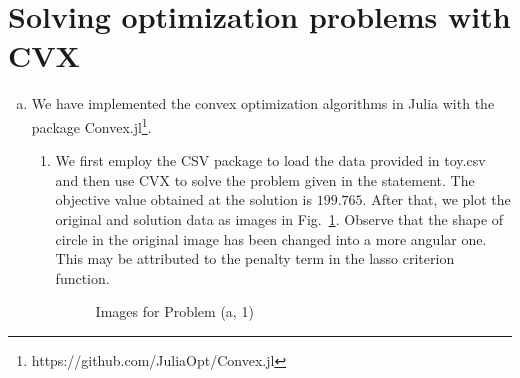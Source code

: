 \documentclass[12pt,letterpaper]{article}
\begin{document}
	\section{Solving optimization problems with CVX}
	\begin{enumerate}[(a)]
		\item We have implemented the convex optimization algorithms in Julia with the package Convex.jl\footnote{https://github.com/JuliaOpt/Convex.jl}. 
		\begin{enumerate}[1.]
			\item We first employ the CSV package to load the data provided in toy.csv and then use CVX to solve the problem given in the statement. The objective value obtained at the solution is $199.765$. After that, we plot the original and solution data as images in Fig.~\ref{fig:4a1}. Observe that the shape of circle in the original image has been changed into a more angular one. This may be attributed to the penalty term in the lasso criterion function.
			\begin{figure}[htbp]
				\centering
				\centering
				\caption{Images for Problem (a, 1)}
				\label{fig:4a1}
			\end{figure}
		

\end{enumerate}
\end{enumerate}
\end{document}
